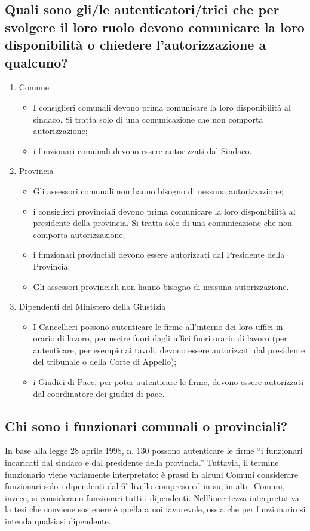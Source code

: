 \documentclass[paper=a4,11pt]{scrartcl}
\begin{document}
\subsection{Quali sono gli/le autenticatori/trici che per svolgere il loro ruolo devono 
comunicare la loro disponibilità o chiedere l’autorizzazione a qualcuno?}
\begin{enumerate}
\item Comune\begin{itemize}
\item I consiglieri comunali devono prima comunicare la loro disponibilità al 
sindaco. Si tratta solo di una comunicazione che non comporta autorizzazione;
\item i funzionari comunali devono essere autorizzati dal Sindaco.\end{itemize}

\item Provincia
\begin{itemize}
\item Gli assessori comunali non hanno bisogno di nessuna autorizzazione;
\item i consiglieri provinciali devono prima comunicare la loro disponibilità al 
presidente della provincia. Si tratta solo di una comunicazione che non 
comporta autorizzazione;
\item i funzionari provinciali devono essere autorizzati dal Presidente della 
Provincia;
\item Gli assessori provinciali non hanno bisogno di nessuna autorizzazione.
\end{itemize}
\item Dipendenti del Ministero della Giustizia
\begin{itemize}
\item I Cancellieri possono autenticare le firme all'interno dei loro uffici in 
orario di lavoro, per uscire fuori dagli uffici fuori orario di lavoro (per 
autenticare, per esempio ai tavoli, devono essere autorizzati dal presidente 
del tribunale o della Corte di Appello);
\item i Giudici di Pace, per poter autenticare le firme, devono essere autorizzati 
dal coordinatore dei giudici di pace.\end{itemize}\end{enumerate}

\subsection{Chi sono i funzionari comunali o provinciali?}
In base alla legge 28 aprile 1998, n. 130 possono autenticare le firme ``i 
funzionari incaricati dal sindaco e dal presidente della provincia.'' Tuttavia, 
il termine funzionario viene variamente interpretato: è prassi in alcuni Comuni 
considerare funzionari solo i dipendenti dal $6^{\circ}$ livello compreso ed in su; in 
altri Comuni, invece, si considerano funzionari tutti i dipendenti. 
Nell'incertezza interpretativa la tesi che conviene sostenere è quella a noi 
favorevole, ossia che per funzionario si intenda qualsiasi dipendente.
\end{document}
